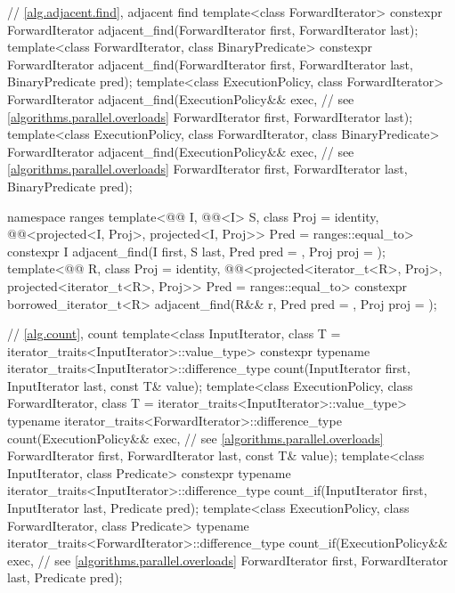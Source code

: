 \begin{codeblock}
{  // \ref{alg.adjacent.find}, adjacent find
  template<class ForwardIterator>
    constexpr ForwardIterator
      adjacent_find(ForwardIterator first, ForwardIterator last);
  template<class ForwardIterator, class BinaryPredicate>
    constexpr ForwardIterator
      adjacent_find(ForwardIterator first, ForwardIterator last,
                    BinaryPredicate pred);
  template<class ExecutionPolicy, class ForwardIterator>
    ForwardIterator
      adjacent_find(ExecutionPolicy&& exec,                     // see \ref{algorithms.parallel.overloads}
                    ForwardIterator first, ForwardIterator last);
  template<class ExecutionPolicy, class ForwardIterator, class BinaryPredicate>
    ForwardIterator
      adjacent_find(ExecutionPolicy&& exec,                     // see \ref{algorithms.parallel.overloads}
                    ForwardIterator first, ForwardIterator last,
                    BinaryPredicate pred);

  namespace ranges {
    template<@@ I, @@<I> S, class Proj = identity,
             @@<projected<I, Proj>,
                                       projected<I, Proj>> Pred = ranges::equal_to>
      constexpr I adjacent_find(I first, S last, Pred pred = {},
                                Proj proj = {});
    template<@@ R, class Proj = identity,
             @@<projected<iterator_t<R>, Proj>,
                                       projected<iterator_t<R>, Proj>> Pred = ranges::equal_to>
      constexpr borrowed_iterator_t<R>
        adjacent_find(R&& r, Pred pred = {}, Proj proj = {});
  }

  // \ref{alg.count}, count
  template<class InputIterator, class T = iterator_traits<InputIterator>::value_type>
    constexpr typename iterator_traits<InputIterator>::difference_type
      count(InputIterator first, InputIterator last, const T& value);
  template<class ExecutionPolicy, class ForwardIterator,
           class T = iterator_traits<InputIterator>::value_type>
    typename iterator_traits<ForwardIterator>::difference_type
      count(ExecutionPolicy&& exec,                             // see \ref{algorithms.parallel.overloads}
            ForwardIterator first, ForwardIterator last, const T& value);
  template<class InputIterator, class Predicate>
    constexpr typename iterator_traits<InputIterator>::difference_type
      count_if(InputIterator first, InputIterator last, Predicate pred);
  template<class ExecutionPolicy, class ForwardIterator, class Predicate>
    typename iterator_traits<ForwardIterator>::difference_type
      count_if(ExecutionPolicy&& exec,                          // see \ref{algorithms.parallel.overloads}
               ForwardIterator first, ForwardIterator last, Predicate pred);

}
\end{codeblock}
